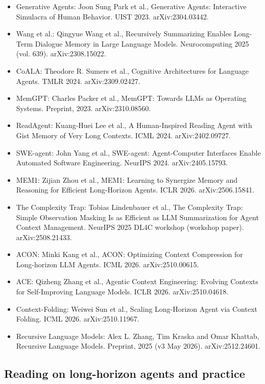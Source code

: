 \begin{itemize}[leftmargin=*]
\item Generative Agents: Joon Sung Park et al., Generative Agents: Interactive Simulacra of Human Behavior. UIST 2023. arXiv:2304.03442.
\item Wang et al.: Qingyue Wang et al., Recursively Summarizing Enables Long-Term Dialogue Memory in Large Language Models. Neurocomputing 2025 (vol. 639). arXiv:2308.15022.
\item CoALA: Theodore R. Sumers et al., Cognitive Architectures for Language Agents. TMLR 2024. arXiv:2309.02427.
\item MemGPT: Charles Packer et al., MemGPT: Towards LLMs as Operating Systems. Preprint, 2023. arXiv:2310.08560.
\item ReadAgent: Kuang-Huei Lee et al., A Human-Inspired Reading Agent with Gist Memory of Very Long Contexts. ICML 2024. arXiv:2402.09727.
\item SWE-agent: John Yang et al., SWE-agent: Agent-Computer Interfaces Enable Automated Software Engineering. NeurIPS 2024. arXiv:2405.15793.
\item MEM1: Zijian Zhou et al., MEM1: Learning to Synergize Memory and Reasoning for Efficient Long-Horizon Agents. ICLR 2026. arXiv:2506.15841.
\item The Complexity Trap: Tobias Lindenbauer et al., The Complexity Trap: Simple Observation Masking Is as Efficient as LLM Summarization for Agent Context Management. NeurIPS 2025 DL4C workshop (workshop paper). arXiv:2508.21433.
\item ACON: Minki Kang et al., ACON: Optimizing Context Compression for Long-horizon LLM Agents. ICML 2026. arXiv:2510.00615.
\item ACE: Qizheng Zhang et al., Agentic Context Engineering: Evolving Contexts for Self-Improving Language Models. ICLR 2026. arXiv:2510.04618.
\item Context-Folding: Weiwei Sun et al., Scaling Long-Horizon Agent via Context Folding. ICML 2026. arXiv:2510.11967.
\item Recursive Language Models: Alex L. Zhang, Tim Kraska and Omar Khattab, Recursive Language Models. Preprint, 2025 (v3 May 2026). arXiv:2512.24601.
\end{itemize}

\subsection{Reading on long-horizon agents and practice}
\label{sec:it-R-practice}

